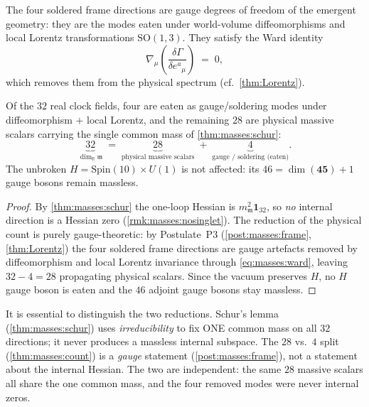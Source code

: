 \begin{postulate}\label{post:masses:frame}
The four soldered frame directions are gauge degrees of freedom of the emergent
geometry: they are the modes eaten under world-volume diffeomorphisms and local
Lorentz transformations $\mathrm{SO}(1,3)$. They satisfy the Ward identity
\begin{equation}\label{eq:masses:ward}
  \nabla_{\mu}\!\left(\frac{\delta\Gamma}{\delta e^{a}{}_{\mu}}\right) \;=\; 0,
\end{equation}
which removes them from the physical spectrum (cf.\ \autoref{thm:Lorentz}).
\end{postulate}

\begin{theorem}\label{thm:masses:count}
Of the $32$ real clock fields, four are eaten as gauge/soldering modes under
diffeomorphism $+$ local Lorentz, and the remaining $28$ are physical massive
scalars carrying the single common mass of \autoref{thm:masses:schur}:
\begin{equation}\label{eq:masses:count}
  \underbrace{32}_{\dim_{\mathbb R}\mathfrak m}
  \;=\;
  \underbrace{28}_{\text{physical massive scalars}}
  \;+\;
  \underbrace{4}_{\text{gauge / soldering (eaten)}} .
\end{equation}
The unbroken $H=\mathrm{Spin}(10)\times U(1)$ is not affected: its
$46=\dim(\mathbf{45})+1$ gauge bosons remain massless.
\end{theorem}

\begin{proof}
By \autoref{thm:masses:schur} the one-loop Hessian is $m_{\mathfrak m}^{2}
\mathbf 1_{32}$, so \emph{no} internal direction is a Hessian zero
(\autoref{rmk:masses:nosinglet}). The reduction of the physical count is purely
gauge-theoretic: by Postulate~P3 (\autoref{post:masses:frame},
\autoref{thm:Lorentz}) the four soldered frame directions are gauge artefacts
removed by diffeomorphism and local Lorentz invariance through
\eqref{eq:masses:ward}, leaving $32-4=28$ propagating physical scalars. Since
the vacuum preserves $H$, no $H$ gauge boson is eaten and the $46$ adjoint
gauge bosons stay massless.
\end{proof}

\begin{remark}\label{rmk:masses:separation}
It is essential to distinguish the two reductions. Schur's lemma
(\autoref{thm:masses:schur}) uses \emph{irreducibility} to fix ONE common mass
on all $32$ directions; it never produces a massless internal subspace. The
$28$ vs.\ $4$ split (\autoref{thm:masses:count}) is a \emph{gauge} statement
(\autoref{post:masses:frame}), not a statement about the internal Hessian. The
two are independent: the same $28$ massive scalars all share the one common
mass, and the four removed modes were never internal zeros.
\end{remark}

